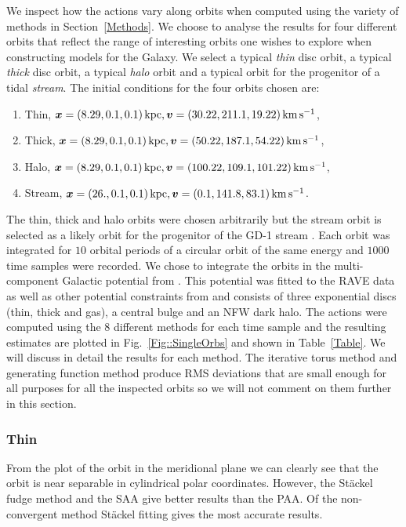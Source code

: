 \documentclass[useAMS,usenatbib,fleqn,a4paper]{mn2e}
\def\kpc{\,{\rm kpc}}
\def\kms{\,{\rm km\,s^{-1}}}
\newcommand{\bs}[1]{\bmath{#1}}
\begin{document}
We inspect how the actions vary along orbits when computed using the variety of methods in Section~\ref{Methods}. We choose to analyse the results for four different orbits that reflect the range of interesting orbits one wishes to explore when constructing models for the Galaxy. We select a typical \emph{thin} disc orbit, a typical \emph{thick} disc orbit, a typical \emph{halo} orbit and a typical orbit for the progenitor of a tidal \emph{stream}. The initial conditions for the four orbits chosen are:
\begin{enumerate}
\item Thin, $\bs{x} = (8.29,0.1,0.1)\kpc, \bs{v}=(30.22,211.1,19.22)\kms$,
\item Thick, $\bs{x} = (8.29,0.1,0.1)\kpc, \bs{v}=(50.22,187.1,54.22)\kms$,
\item Halo, $\bs{x} = (8.29,0.1,0.1)\kpc, \bs{v}=(100.22,109.1,101.22)\kms$,
\item Stream, $\bs{x} = (26.,0.1,0.1)\kpc, \bs{v}=(0.1,141.8,83.1)\kms$.
\end{enumerate}
The thin, thick and halo orbits were chosen arbitrarily but the stream orbit is selected as a likely orbit for the progenitor of the GD-1 stream \citep{Koposov2010,SandersBinney2013b}. Each orbit was integrated for $10$ orbital periods of a circular orbit of the same energy and $1000$ time samples were recorded. We chose to integrate the orbits in the multi-component Galactic potential from \cite{Piffl2014}. This potential was fitted to the RAVE data as well as other potential constraints from \cite{McMillan2011} and consists of three exponential discs (thin, thick and gas), a central bulge and an NFW dark halo. The actions were computed using the $8$ different methods for each time sample and the resulting estimates are plotted in Fig.~\ref{Fig::SingleOrbs} and shown in Table~\ref{Table}. We will discuss in detail the results for each method. The iterative torus method and generating function method produce RMS deviations that are small enough for all purposes for all the inspected orbits so we will not comment on them further in this section.


\subsubsection{Thin}
From the plot of the orbit in the meridional plane we can clearly see that the orbit is near separable in cylindrical polar coordinates. However, the St\"ackel fudge method and the SAA give better results than the PAA. Of the non-convergent method St\"ackel fitting gives the most accurate results.
\end{document}
